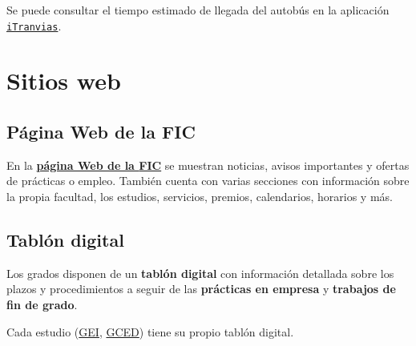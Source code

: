\begin{infoBox}
    Se puede consultar el tiempo estimado de llegada del autobús en la aplicación \href{https://tranviascoruna.com/}{\texttt{iTranvias}}.
\end{infoBox}


\section{Sitios web}

\subsection{Página Web de la FIC}

En  la \href{https://www.fic.udc.es/}{\textbf{página Web de la \acrshort{FIC}}} se muestran noticias, avisos importantes y ofertas de prácticas o empleo. También cuenta con varias secciones con información sobre la propia facultad, los estudios, servicios, premios, calendarios, horarios y más.

\FloatBarrier
\begin{figure}[htp]
    \centering
\end{figure}
\FloatBarrier

\subsection{Tablón digital}

Los grados disponen de un \textbf{tablón digital} con información detallada sobre los plazos y procedimientos a seguir de las \textbf{prácticas en empresa} y \textbf{trabajos de fin de grado}.

\begin{infoBox}
    Cada estudio (\href{\linkTaboleiroGEI}{\acrshort{GEI}}, \href{\linkTaboleiroGCED}{\acrshort{GCED}}) tiene su propio tablón digital.
\end{infoBox}

